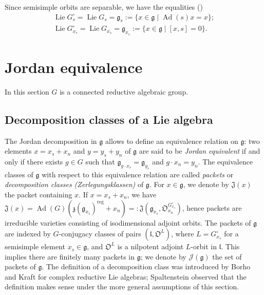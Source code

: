 \documentclass[12pt]{amsart}
\theoremstyle{definition}
\theoremstyle{remark}
\newcommand{\g}{\mathfrak{g}}
\renewcommand{\l}{\mathfrak{l}}
\newcommand{\z}{\mathfrak{z}}
\newcommand{\J}{\mathfrak{J}}
\newcommand{\orb}{\mathfrak{O}}
\newcommand{\Ad}{\operatorname{Ad}}
\newcommand{\Lie}{\operatorname{Lie}}
\newcommand{\reg}{{\operatorname{reg}}}
\begin{document}
Since semisimple orbits are separable, we have the equalities (\cite[Proposition 1.5]{BoSp})
\begin{eqnarray*}
\Lie G_s^\circ = \Lie G_s = \g_s := \{x \in \g \mid \Ad(s) x = x \}; \\ 
\Lie G_{x_s}^\circ = \Lie G_{x_s} = \g_{x_s} := \{x \in \g \mid [x,s] = 0\}.
\end{eqnarray*}



\section{Jordan equivalence} \label{s_jordan}
In this section $G$ is a connected reductive algebraic group.

\subsection{Decomposition classes of a Lie algebra}
The Jordan decomposition in $\g$ allows to define an equivalence relation on $\g$: two elements $x = x_s + x_n$ and $y = y_s + y_n$ of $\g$ are said to be \emph{Jordan equivalent } if and only if there exists $g \in G$ such that $\g_{g \cdot x_s} = \g_{y_s}$ and $ g \cdot x_n = y_n$.
The equivalence classes of $\g$ with respect to this equivalence relation are called \emph{packets} or \emph{decomposition classes (Zerlegungsklassen)} of $\g$.
For $x \in \g$, we denote by $\J(x)$ the packet containing $x$.
If $x = x_s + x_n$, we have $\J(x) = \Ad(G)(\z(\g_{x_s})^\reg + x_n) =: \J(\g_{x_s}, \orb^{G_{x_s}^\circ}_{x_n})$, hence packets are irreducible varieties consisting of isodimensional adjoint orbits.
The packets of $\g$ are indexed by $G$-conjugacy classes of pairs $(\l, \orb^L)$, where $L = G_{x_s}^\circ$ for a semisimple element $x_s \in \g$, and $\orb^L$ is a nilpotent adjoint $L$-orbit in $\l$. 
This implies there are finitely many packets in $\g$; we denote by $\mathcal{J}(\g)$ the set of packets of $\g$.
The definition of a decomposition class was introduced by Borho and Kraft \cite{BK79} for complex reductive Lie algebras;  Spaltenstein \cite{Sp_bad} observed that the definition makes sense under the more general assumptions of this section.
\end{document}
